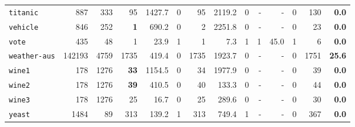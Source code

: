 \begin{tabular}{lccrrrrrrrrrrr}
\texttt{titanic} & \multicolumn{1}{r}{887} & \multicolumn{1}{r}{333}  & 95 & 1427.7 & 0 & 95 & 2119.2 & 0 & - & - & 0 & 130 & \textbf{0.0}\\
\texttt{vehicle} & \multicolumn{1}{r}{846} & \multicolumn{1}{r}{252}  & \textbf{1} & 690.2 & 0 & 2 & 2251.8 & 0 & - & - & 0 & 23 & \textbf{0.0}\\
\texttt{vote} & \multicolumn{1}{r}{435} & \multicolumn{1}{r}{48}  & 1 & 23.9 & 1 & 1 & 7.3 & 1 & 1 & 45.0 & 1 & 6 & \textbf{0.0}\\
\texttt{weather-aus} & \multicolumn{1}{r}{142193} & \multicolumn{1}{r}{4759}  & 1735 & 419.4 & 0 & 1735 & 1923.7 & 0 & - & - & 0 & 1751 & \textbf{25.6}\\
\texttt{wine1} & \multicolumn{1}{r}{178} & \multicolumn{1}{r}{1276}  & \textbf{33} & 1154.5 & 0 & 34 & 1977.9 & 0 & - & - & 0 & 39 & \textbf{0.0}\\
\texttt{wine2} & \multicolumn{1}{r}{178} & \multicolumn{1}{r}{1276}  & \textbf{39} & 410.5 & 0 & 40 & 133.3 & 0 & - & - & 0 & 44 & \textbf{0.0}\\
\texttt{wine3} & \multicolumn{1}{r}{178} & \multicolumn{1}{r}{1276}  & 25 & 16.7 & 0 & 25 & 289.6 & 0 & - & - & 0 & 30 & \textbf{0.0}\\
\texttt{yeast} & \multicolumn{1}{r}{1484} & \multicolumn{1}{r}{89}  & 313 & 139.2 & 1 & 313 & 749.4 & 1 & - & - & 0 & 367 & \textbf{0.0}\\
\bottomrule
\end{tabular}
